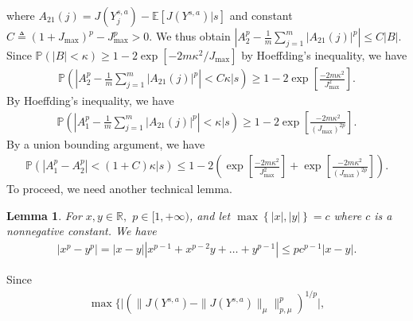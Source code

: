 \documentclass[12pt,technote,onecolumn]{IEEEtran}
\newtheorem{lemma}{Lemma}
\begin{document}
\begin{IEEEproof}
\begin{enumerate}
		where $A_{21}(j)=J(Y_{j}^{s,a})-\mathbb{E}[J(Y^{s,a})|s]$
		and constant $C\triangleq\left(1+J_{\max}\right)^{p}-J_{\max}^{p}>0.$
		We thus obtain $\left|A_{2}^{p}-\frac{1}{m}\sum_{j=1}^{m}\left|A_{21}\left(j\right)\right|^{p}\right|\leq C\left|B\right|.$
		Since $\mathbb{P}\left(\left|B\right|<\kappa\right)\geq1-2\exp[-2m\kappa^{2}/J_{\max}]$
		by Hoeffding's inequality, we have
		\begin{equation*}
		\begin{aligned}
		\mathbb{P}\left(
		\left|A_{2}^{p}-\frac{1}{m}\sum_{j=1}^{m}|A_{21}(j)|^{p}\right|<C\kappa|s\right)
		\geq1-2\exp\left[\frac{-2m\kappa^{2}}{J_{\max}^{2}}\right].
		\end{aligned}
		\end{equation*}
		By Hoeffding's inequality, we have
		\begin{equation*}
		\begin{aligned}
		\mathbb{P}\left(\left|A_{1}^{p}-\frac{1}{m}\sum_{j=1}^{m}\left|A_{21}\left(j\right)\right|^{p}\right|<\kappa|s\right)
		\geq1-2\exp\left[\frac{-2m\kappa^{2}}{\left(J_{\max}\right)^{2p}}\right].
		\end{aligned}
		\end{equation*}
		By a union bounding argument, we have 
		\begin{equation*}
		\begin{aligned}
		\mathbb{P}\left(\left|A_{1}^{p}-A_{2}^{p}\right|<\left(1+C\right)\kappa|s\right)
		\leq1-2\left(\exp\left[\frac{-2m\kappa^{2}}{J_{\max}^{2}}\right]+\exp\left[\frac{-2m\kappa^{2}}{\left(J_{\max}\right)^{2p}}\right]\right).
		\end{aligned}
		\end{equation*}
		To proceed, we need another technical lemma.
		\begin{lemma}
			\label{lem:tech-2} For $x,y\in\mathbb{R},$ $p\in[1,+\infty)$,
			and let $\max\left\{ \left|x\right|,\left|y\right|\right\} =c$
			where $c$ is a nonnegative constant. We have
			\begin{equation*}
			\begin{aligned}
			\left|x^{p}-y^{p}\right|=\left|x-y\right|\left|x^{p-1}+x^{p-2}y+\dots+y^{p-1}\right|
			\leq pc^{p-1}\left|x-y\right|.
			\end{aligned}
			\end{equation*}
		\end{lemma}
		Since 
		\begin{equation*}
		\begin{aligned}
		\max\big\{\big|(\|J(Y^{s,a})-\|J(Y^{s,a})\|_{\mu}\|_{p,\mu}^{p})^{1/p}\big|,

\end{aligned}
\end{equation*}
\end{enumerate}
\end{IEEEproof}
\end{document}
